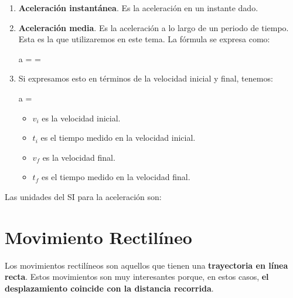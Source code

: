 \begin{enumerate}[label=\numberballmDarkTeal]
        \item \textbf{Aceleración instantánea}.
        Es la aceleración en un instante dado.

        \item \textbf{Aceleración media}.
        Es la aceleración a lo largo de un periodo de tiempo.
        Esta es la que utilizaremos en este tema.
        La fórmula se expresa como:
        \begin{centeredequation}
            a =  = 
        \end{centeredequation}

        \item Si expresamos esto en términos de la velocidad inicial y final, tenemos:
        \begin{centeredequation}
            a = 
        \end{centeredequation}
        \begin{itemize}
            \item \( v_i \) es la velocidad inicial.
            \item \( t_i \) es el tiempo medido en la velocidad inicial.
            \item \( v_f \) es la velocidad final.
            \item \( t_f \) es el tiempo medido en la velocidad final.
        \end{itemize}
\end{enumerate}

Las unidades del SI para la aceleración son: \unit{\mpss}


\section{Movimiento Rectilíneo}

Los movimientos rectilíneos son aquellos que tienen una \textbf{trayectoria en línea recta}.
Estos movimientos son muy interesantes porque, en estos casos, \textbf{el desplazamiento coincide con la distancia recorrida}.

